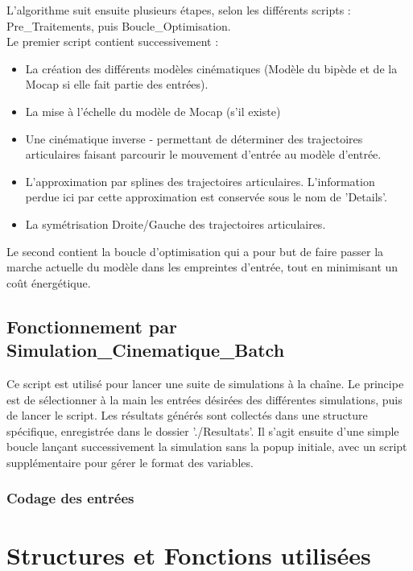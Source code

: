 \documentclass{article}
\begin{document}
L'algorithme suit ensuite plusieurs étapes, selon les différents scripts : Pre\_Traitements, puis Boucle\_Optimisation.\\ 
%
Le premier script contient successivement : 
\begin{itemize}
    \item La création des différents modèles cinématiques (Modèle du bipède et de la Mocap si elle fait partie des entrées).
    \item La mise à l'échelle du modèle de Mocap (s'il existe)
    \item Une cinématique inverse - permettant de déterminer des trajectoires articulaires faisant parcourir le mouvement d'entrée au modèle d'entrée.
    \item L'approximation par splines des trajectoires articulaires. L'information perdue ici par cette approximation est conservée sous le nom de 'Details'.
    \item La symétrisation Droite/Gauche des trajectoires articulaires.
\end{itemize}

Le second contient la boucle d'optimisation qui a pour but de faire passer la marche actuelle du modèle dans les empreintes d'entrée, tout en minimisant un coût énergétique.\\
%

\subsection{Fonctionnement par Simulation\_Cinematique\_Batch}

Ce script est utilisé pour lancer une suite de simulations à la chaîne. 
%
Le principe est de sélectionner à la main les entrées désirées des différentes simulations, puis de lancer le script.
%
Les résultats générés sont collectés dans une structure spécifique, enregistrée dans le dossier './Resultats'.
% 
Il s'agit ensuite d'une simple boucle lançant successivement la simulation sans la popup initiale, avec un script supplémentaire pour gérer le format des variables.

\subsubsection{Codage des entrées}


\section{Structures et Fonctions utilisées}
\end{document}
